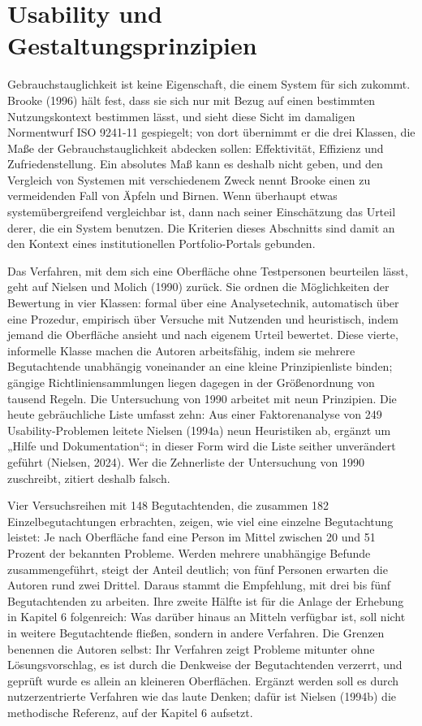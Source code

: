 \section{Usability und Gestaltungsprinzipien}
\label{sec:usability}

Gebrauchstauglichkeit ist keine Eigenschaft, die einem System für sich zukommt. Brooke (1996) hält fest, dass sie sich nur mit Bezug auf einen bestimmten Nutzungskontext bestimmen lässt, und sieht diese Sicht im damaligen Normentwurf ISO 9241-11 gespiegelt; von dort übernimmt er die drei Klassen, die Maße der Gebrauchstauglichkeit abdecken sollen: Effektivität, Effizienz und Zufriedenstellung. Ein absolutes Maß kann es deshalb nicht geben, und den Vergleich von Systemen mit verschiedenem Zweck nennt Brooke einen zu vermeidenden Fall von Äpfeln und Birnen. Wenn überhaupt etwas systemübergreifend vergleichbar ist, dann nach seiner Einschätzung das Urteil derer, die ein System benutzen. Die Kriterien dieses Abschnitts sind damit an den Kontext eines institutionellen Portfolio-Portals gebunden.

Das Verfahren, mit dem sich eine Oberfläche ohne Testpersonen beurteilen lässt, geht auf Nielsen und Molich (1990) zurück. Sie ordnen die Möglichkeiten der Bewertung in vier Klassen: formal über eine Analysetechnik, automatisch über eine Prozedur, empirisch über Versuche mit Nutzenden und heuristisch, indem jemand die Oberfläche ansieht und nach eigenem Urteil bewertet. Diese vierte, informelle Klasse machen die Autoren arbeitsfähig, indem sie mehrere Begutachtende unabhängig voneinander an eine kleine Prinzipienliste binden; gängige Richtliniensammlungen liegen dagegen in der Größenordnung von tausend Regeln. Die Untersuchung von 1990 arbeitet mit neun Prinzipien. Die heute gebräuchliche Liste umfasst zehn: Aus einer Faktorenanalyse von 249 Usability-Problemen leitete Nielsen (1994a) neun Heuristiken ab, ergänzt um „Hilfe und Dokumentation“; in dieser Form wird die Liste seither unverändert geführt (Nielsen, 2024). Wer die Zehnerliste der Untersuchung von 1990 zuschreibt, zitiert deshalb falsch.

Vier Versuchsreihen mit 148 Begutachtenden, die zusammen 182 Einzelbegutachtungen erbrachten, zeigen, wie viel eine einzelne Begutachtung leistet: Je nach Oberfläche fand eine Person im Mittel zwischen 20 und 51 Prozent der bekannten Probleme. Werden mehrere unabhängige Befunde zusammengeführt, steigt der Anteil deutlich; von fünf Personen erwarten die Autoren rund zwei Drittel. Daraus stammt die Empfehlung, mit drei bis fünf Begutachtenden zu arbeiten. Ihre zweite Hälfte ist für die Anlage der Erhebung in Kapitel 6 folgenreich: Was darüber hinaus an Mitteln verfügbar ist, soll nicht in weitere Begutachtende fließen, sondern in andere Verfahren. Die Grenzen benennen die Autoren selbst: Ihr Verfahren zeigt Probleme mitunter ohne Lösungsvorschlag, es ist durch die Denkweise der Begutachtenden verzerrt, und geprüft wurde es allein an kleineren Oberflächen. Ergänzt werden soll es durch nutzerzentrierte Verfahren wie das laute Denken; dafür ist Nielsen (1994b) die methodische Referenz, auf der Kapitel 6 aufsetzt.

